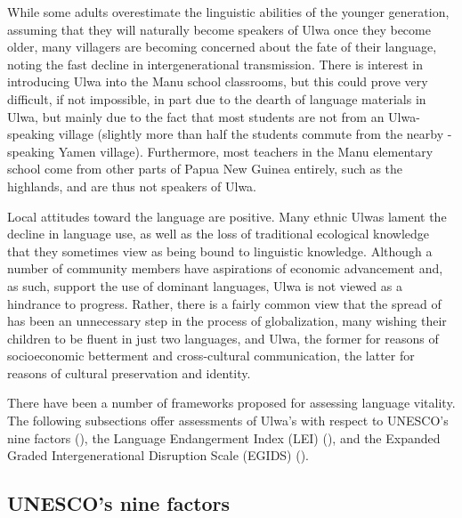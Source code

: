 While some adults overestimate the linguistic abilities of the younger generation, assuming that they will naturally become speakers of Ulwa once they become older, many villagers are becoming concerned about the fate of their language, noting the fast decline in intergenerational transmission. There is interest in introducing Ulwa into the Manu school classrooms, but this could prove very difficult, if not impossible, in part due to the dearth of language materials in Ulwa, but mainly due to the fact that most students are not from an Ulwa-speaking village (slightly more than half the students commute from the nearby -speaking Yamen village). Furthermore, most teachers in the Manu elementary school come from other parts of Papua New Guinea entirely, such as the highlands, and are thus not speakers of Ulwa.

Local attitudes toward the language are positive. Many ethnic Ulwas lament the decline in language use, as well as the loss of traditional ecological knowledge that they sometimes view as being bound to linguistic knowledge. Although a number of community members have aspirations of economic advancement and, as such, support the use of dominant languages, Ulwa is not viewed as a hindrance to progress. Rather, there is a fairly common view that the spread of  has been an unnecessary step in the process of globalization, many wishing their children to be fluent in just two languages,  and Ulwa, the former for reasons of socioeconomic betterment and cross-cultural communication, the latter for reasons of cultural preservation and identity. \largerpage[2]



There have been a number of frameworks proposed for assessing language \linebreak vitality. The following subsections offer assessments of Ulwa’s  with \linebreak respect to UNESCO’s nine factors (), the Language Endangerment Index (LEI) (), and the Expanded Graded Intergenerational Disruption Scale \linebreak (EGIDS) ().

\subsection{UNESCO’s nine factors}\label{sec:1.6.1}

